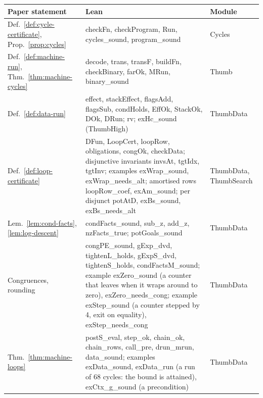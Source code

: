 \documentclass[oneside,english]{amsart}
\numberwithin{equation}{section}
\theoremstyle{plain}
\theoremstyle{definition}
\theoremstyle{plain}
\theoremstyle{plain}
\theoremstyle{remark}
\newcommand{\lean}[1]{{\ttfamily\small #1}}
\begin{document}
\begin{table}[ht]
\centering
\small
\begin{tabular}{@{}>{\raggedright\arraybackslash}p{}>{\raggedright\arraybackslash}p{}>{\raggedright\arraybackslash}p{}@{}}
\toprule
Paper statement & Lean & Module \\
\midrule
Def.~\ref{def:cycle-certificate}, Prop.~\ref{prop:cycles} & \lean{checkFn}, \lean{checkProgram}, \lean{Run}, \lean{cycles\_\allowbreak sound}, \lean{program\_\allowbreak sound} & \lean{Cycles} \\
Def.~\ref{def:machine-run}, Thm.~\ref{thm:machine-cycles} & \lean{decode}, \lean{trans}, \lean{transF}, \lean{buildFn}, \lean{checkBinary}, \lean{farOk}, \lean{MRun}, \lean{binary\_\allowbreak sound} & \lean{Thumb} \\
Def.~\ref{def:data-run} & \lean{effect}, \lean{stackEffect}, \lean{flagsAdd}, \lean{flagsSub}, \lean{condHolds}, \lean{EffOk}, \lean{StackOk}, \lean{DOk}, \lean{DRun}; \lean{rv}; \lean{exHc\_\allowbreak sound} (\lean{ThumbHigh}) & \lean{ThumbData} \\
Def.~\ref{def:loop-certificate} & \lean{DFun}, \lean{LoopCert}, \lean{loopRow}, \lean{obligations}, \lean{congOk}, \lean{checkData}; disjunctive invariants \lean{invsAt}, \lean{tgtIdx}, \lean{tgtInv}; examples \lean{exWrap\_\allowbreak sound}, \lean{exWrap\_\allowbreak needs\_\allowbreak alt}; amortised rows \lean{loopRow\_\allowbreak coef}, \lean{exAm\_\allowbreak sound}; per disjunct \lean{potAtD}, \lean{exBs\_\allowbreak sound}, \lean{exBs\_\allowbreak needs\_\allowbreak alt} & \lean{ThumbData}, \lean{ThumbSearch} \\
Lem.~\ref{lem:cond-facts}, \ref{lem:log-descent} & \lean{condFacts\_\allowbreak sound}, \lean{sub\_\allowbreak z}, \lean{add\_\allowbreak z}, \lean{nzFacts\_\allowbreak true}; \lean{potGoals\_\allowbreak sound} & \lean{ThumbData} \\
Congruences, rounding & \lean{congPE\_\allowbreak sound}, \lean{gExp\_\allowbreak dvd}, \lean{tightenL\_\allowbreak holds}, \lean{gExpS\_\allowbreak dvd}, \lean{tightenS\_\allowbreak holds}, \lean{condFactsM\_\allowbreak sound}; example \lean{exZero\_\allowbreak sound} (a counter that leaves when it wraps around to zero), \lean{exZero\_\allowbreak needs\_\allowbreak cong}; example \lean{exStep\_\allowbreak sound} (a counter stepped by 4, exit on equality), \lean{exStep\_\allowbreak needs\_\allowbreak cong} & \lean{ThumbData} \\
Thm.~\ref{thm:machine-loops} & \lean{postS\_\allowbreak eval}, \lean{step\_\allowbreak ok}, \lean{chain\_\allowbreak ok}, \lean{chain\_\allowbreak rows}, \lean{call\_\allowbreak pre}, \lean{drun\_\allowbreak mrun}, \lean{data\_\allowbreak sound}; examples \lean{exData\_\allowbreak sound}, \lean{exData\_\allowbreak run} (a run of 68 cycles: the bound is attained), \lean{exCtx\_\allowbreak g\_\allowbreak sound} (a precondition) & \lean{ThumbData} \\

\end{tabular}
\end{table}
\end{document}

